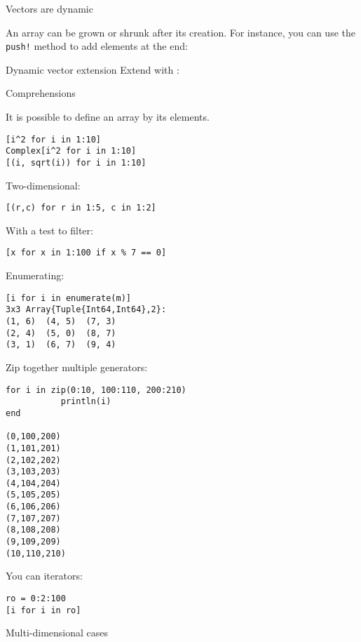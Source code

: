 
 {Vectors are dynamic}
\label{sec:vectorj-dynamic}

  An array
  can be grown or shrunk after its creation.
  For instance, you can use the \lstinline{push!} method to add elements at the end:

\begin{block}{Dynamic vector extension}
    \label{sl:vectorj-dynamic}
    Extend with :
\end{block}

 {Comprehensions}

It is possible to define an array by its elements.
\begin{lstlisting}
[i^2 for i in 1:10]
Complex[i^2 for i in 1:10]
[(i, sqrt(i)) for i in 1:10]
\end{lstlisting}

Two-dimensional:
\begin{lstlisting}
[(r,c) for r in 1:5, c in 1:2]
\end{lstlisting}

With a test to filter:
\begin{lstlisting}
[x for x in 1:100 if x % 7 == 0]
\end{lstlisting}

Enumerating:
\begin{lstlisting}
[i for i in enumerate(m)]
3x3 Array{Tuple{Int64,Int64},2}:
(1, 6)  (4, 5)  (7, 3)
(2, 4)  (5, 0)  (8, 7)
(3, 1)  (6, 7)  (9, 4)
\end{lstlisting}

Zip together multiple generators:
\begin{lstlisting}
for i in zip(0:10, 100:110, 200:210)
           println(i) 
end

(0,100,200)
(1,101,201)
(2,102,202)
(3,103,203)
(4,104,204)
(5,105,205)
(6,106,206)
(7,107,207)
(8,108,208)
(9,109,209)
(10,110,210)
\end{lstlisting}

You can iterators:
\begin{lstlisting}
ro = 0:2:100
[i for i in ro]
\end{lstlisting}

 {Multi-dimensional cases}

